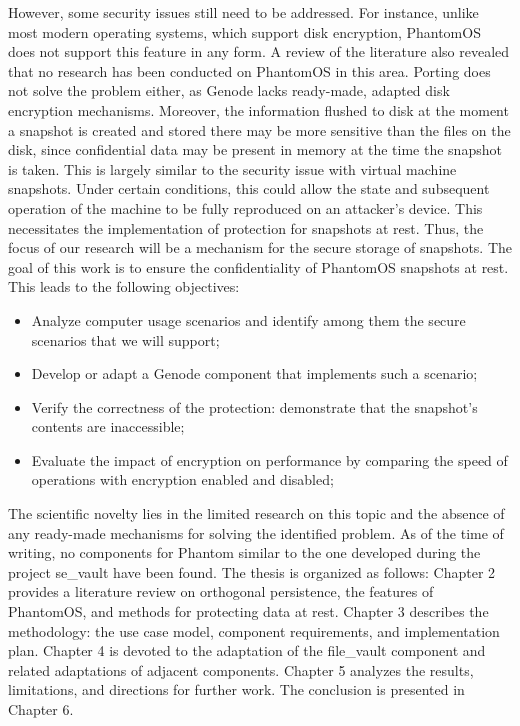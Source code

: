 However, some security issues still need to be addressed. For instance, unlike most modern operating systems, which support disk encryption, PhantomOS does not support this feature in any form. A review of the literature also revealed that no research has been conducted on PhantomOS in this area. Porting does not solve the problem either, as Genode lacks ready-made, adapted disk encryption mechanisms. Moreover, the information flushed to disk at the moment a snapshot is created and stored there may be more sensitive than the files on the disk, since confidential data may be present in memory at the time the snapshot is taken. This is largely similar to the security issue with virtual machine snapshots. Under certain conditions, this could allow the state and subsequent operation of the machine to be fully reproduced on an attacker’s device. This necessitates the implementation of protection for snapshots at rest. Thus, the focus of our research will be a mechanism for the secure storage of snapshots.
The goal of this work is to ensure the confidentiality of PhantomOS snapshots at rest.
This leads to the following objectives:
\begin{itemize}
    \item Analyze computer usage scenarios and identify among them the secure scenarios that we will support;
    \item Develop or adapt a Genode component that implements such a scenario;
    \item Verify the correctness of the protection: demonstrate that the snapshot’s contents are inaccessible;
    \item Evaluate the impact of encryption on performance by comparing the speed of operations with encryption enabled and disabled;
\end{itemize}
The scientific novelty lies in the limited research on this topic and the absence of any ready-made mechanisms for solving the identified problem. As of the time of writing, no components for Phantom similar to the one developed during the project se\_vault have been found.
The thesis is organized as follows: Chapter 2 provides a literature review on orthogonal persistence, the features of PhantomOS, and methods for protecting data at rest. Chapter 3 describes the methodology: the use case model, component requirements, and implementation plan. Chapter 4 is devoted to the adaptation of the file\_vault component and related adaptations of adjacent components. Chapter 5 analyzes the results, limitations, and directions for further work. The conclusion is presented in Chapter 6.
